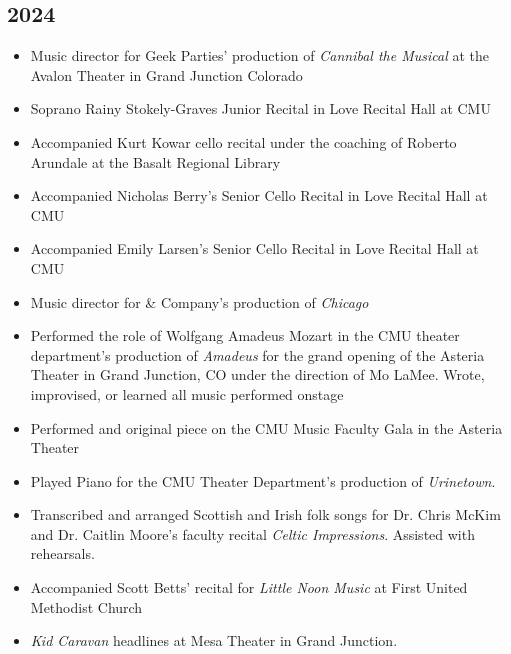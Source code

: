 \documentclass{article}
\newcommand{\cvItem}[1]{
        \item {
            {#1}
        }
    }
\newcommand{\cvItemListStart}{\begin{itemize}[leftmargin=10pt]}
\newcommand{\cvItemListEnd}{\end{itemize}}
\begin{document}
        \subsection{2024}
            \cvItemListStart
                \cvItem{Music director for Geek Parties' production of {\em Cannibal the Musical} at
                the Avalon Theater in Grand Junction Colorado}
                \cvItem{Soprano Rainy Stokely-Graves Junior Recital in Love Recital Hall at CMU}
                \cvItem{Accompanied Kurt Kowar cello recital under the coaching of Roberto Arundale
                at the Basalt Regional Library}
                \cvItem{Accompanied Nicholas Berry's Senior Cello Recital in Love Recital Hall at
                CMU}
                \cvItem{Accompanied Emily Larsen's Senior Cello Recital in Love Recital Hall at CMU}
                \cvItem{Music director for \& Company's production of {\em Chicago}}
                \cvItem{Performed the role of Wolfgang Amadeus Mozart in the CMU theater
                department's production of {\em Amadeus} for the grand opening of the Asteria
                Theater in Grand Junction, CO under the direction of Mo LaMee. Wrote, improvised, or
                learned all music performed onstage}
                \cvItem{Performed and original piece on the CMU Music Faculty Gala in the Asteria
                Theater}
                \cvItem{Played Piano for the CMU Theater Department's production of {\em
                Urinetown}.}
                \cvItem{Transcribed and arranged Scottish and Irish folk songs for Dr. Chris McKim and
                Dr. Caitlin Moore's faculty recital {\em Celtic Impressions}. Assisted with
                rehearsals.}
                \cvItem{Accompanied Scott Betts' recital for {\em Little Noon Music} at First United
                Methodist Church}
                \cvItem{{\em Kid Caravan} headlines at Mesa Theater in Grand Junction.}
            \cvItemListEnd
\end{document}
